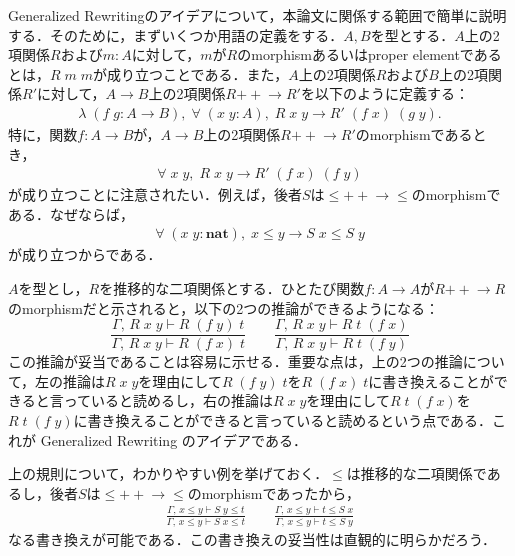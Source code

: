 \documentclass[submit]{ipsj}
\begin{document}
Generalized Rewritingのアイデアについて，本論文に関係する範囲で簡単に説明する．そのために，まずいくつか用語の定義をする．$A,B$を型とする．$A$上の2項関係$R$および$m : A$に対して，$m$が$R$のmorphismあるいはproper elementであるとは，$R\;m\;m$が成り立つことである．また，$A$上の2項関係$R$および$B$上の2項関係$R'$に対して，$A \to B$上の2項関係$R \mathrel{{+}\!\!{+}\!\!{\to}} R'$を以下のように定義する：
\begin{eqnarray*}
\lambda \;(f\;g : A \to B) , \; \forall \; (x \; y : A) , \; R\;x\;y \to R'\; (f\;x)\;(g\;y).
\end{eqnarray*}
特に，関数$f : A \to B$が，$A \to B$上の2項関係$R \mathrel{{+}\!\!{+}\!\!{\to}} R'$のmorphismであるとき，
\begin{eqnarray*}
\forall \; x \; y , \; R\;x\;y \to R'\; (f\;x)\;(f\;y)
\end{eqnarray*}
が成り立つことに注意されたい．例えば，後者$S$は${\leq} \mathrel{{+}\!\!{+}\!\!{\to}} {\leq}$のmorphismである．なぜならば，
\begin{eqnarray*}
\forall \; (x \; y : \mathbf{nat}) , \;x \leq y \to S\;x \leq S\;y
\end{eqnarray*}
が成り立つからである．

$A$を型とし，$R$を推移的な二項関係とする．ひとたび関数$f : A \to A$が$R \mathrel{{+}\!\!{+}\!\!{\to}} R$のmorphismだと示されると，以下の2つの推論ができるようになる：
\[
\frac{\varGamma,\, R\;x\;y \vdash  R\;(f\;y)\;t}{\varGamma,\,  R\;x\;y \vdash  R\;(f\;x)\;t} \qquad \frac{\varGamma,\, R\;x\;y \vdash  R\;t\;(f\;x)}{\varGamma,\,  R\;x\;y \vdash  R\;t\;(f\;y)}
\]
この推論が妥当であることは容易に示せる．重要な点は，上の2つの推論について，左の推論は$R\;x\;y$を理由にして$R\;(f\;y)\;t$を$R\;(f\;x)\;t$に書き換えることができると言っていると読めるし，右の推論は$R\;x\;y$を理由にして$R\;t\;(f\;x)$を$R\;t\;(f\;y)$に書き換えることができると言っていると読めるという点である．これが Generalized Rewriting のアイデアである．

上の規則について，わかりやすい例を挙げておく．$\leq$は推移的な二項関係であるし，後者$S$は${\leq} \mathrel{{+}\!\!{+}\!\!{\to}} {\leq}$のmorphismであったから，
\begin{eqnarray}
\frac{\varGamma,\,x \leq y \vdash  S\;y \leq t}{\varGamma,\,  x \leq y \vdash  S\;x \leq t} \qquad \frac{\varGamma,\, x \leq y \vdash  t \leq S\;x}{\varGamma,\, x \leq y \vdash  t \leq S\;y} \label{fml:twoset}
\end{eqnarray}
なる書き換えが可能である．この書き換えの妥当性は直観的に明らかだろう．
\end{document}
